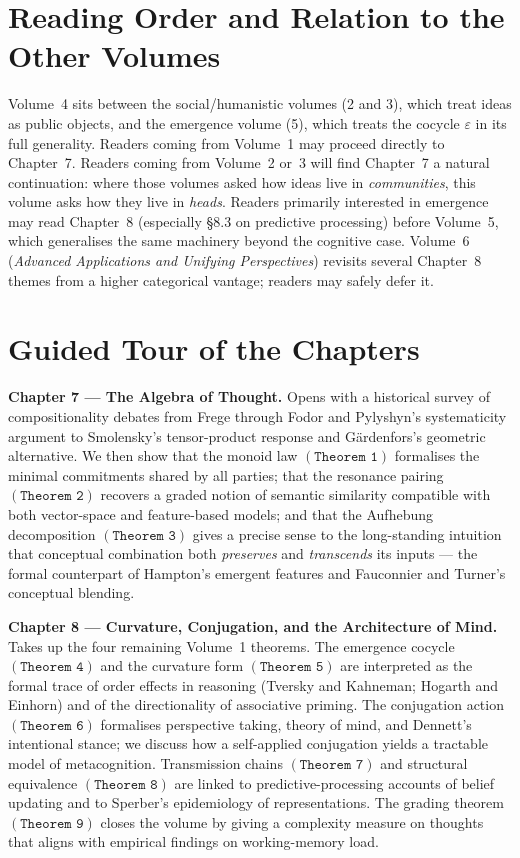 \documentclass[11pt,oneside]{book}
\begin{document}
\section*{Reading Order and Relation to the Other Volumes}
Volume~4 sits between the social/humanistic volumes (2 and 3),
which treat ideas as public objects, and the emergence volume
(5), which treats the cocycle $\varepsilon$ in its full generality.
Readers coming from Volume~1 may proceed directly to Chapter~7.
Readers coming from Volume~2 or~3 will find Chapter~7 a natural
continuation: where those volumes asked how ideas live in
\emph{communities}, this volume asks how they live in \emph{heads}.
Readers primarily interested in emergence may read Chapter~8
(especially \S 8.3 on predictive processing) before Volume~5, which
generalises the same machinery beyond the cognitive case.
Volume~6 (\emph{Advanced Applications and Unifying Perspectives})
revisits several Chapter~8 themes from a higher categorical
vantage; readers may safely defer it.

\section*{Guided Tour of the Chapters}
\textbf{Chapter 7 --- The Algebra of Thought.}  Opens with a
historical survey of compositionality debates from Frege through
Fodor and Pylyshyn's systematicity argument to Smolensky's
tensor-product response and G\"ardenfors's geometric alternative.
We then show that the monoid law $(\texttt{Theorem 1})$ formalises
the minimal commitments shared by all parties; that the resonance
pairing $(\texttt{Theorem 2})$ recovers a graded notion of semantic
similarity compatible with both vector-space and feature-based
models; and that the Aufhebung decomposition $(\texttt{Theorem 3})$
gives a precise sense to the long-standing intuition that
conceptual combination both \emph{preserves} and \emph{transcends}
its inputs --- the formal counterpart of Hampton's emergent
features and Fauconnier and Turner's conceptual blending.

\textbf{Chapter 8 --- Curvature, Conjugation, and the Architecture
of Mind.}  Takes up the four remaining Volume~1 theorems.  The
emergence cocycle $(\texttt{Theorem 4})$ and the curvature form
$(\texttt{Theorem 5})$ are interpreted as the formal trace of
order effects in reasoning (Tversky and Kahneman; Hogarth and
Einhorn) and of the directionality of associative priming.  The
conjugation action $(\texttt{Theorem 6})$ formalises perspective
taking, theory of mind, and Dennett's intentional stance; we
discuss how a self-applied conjugation yields a tractable model of
metacognition.  Transmission chains $(\texttt{Theorem 7})$ and
structural equivalence $(\texttt{Theorem 8})$ are linked to
predictive-processing accounts of belief updating and to Sperber's
epidemiology of representations.  The grading theorem
$(\texttt{Theorem 9})$ closes the volume by giving a complexity
measure on thoughts that aligns with empirical findings on
working-memory load.
\end{document}
